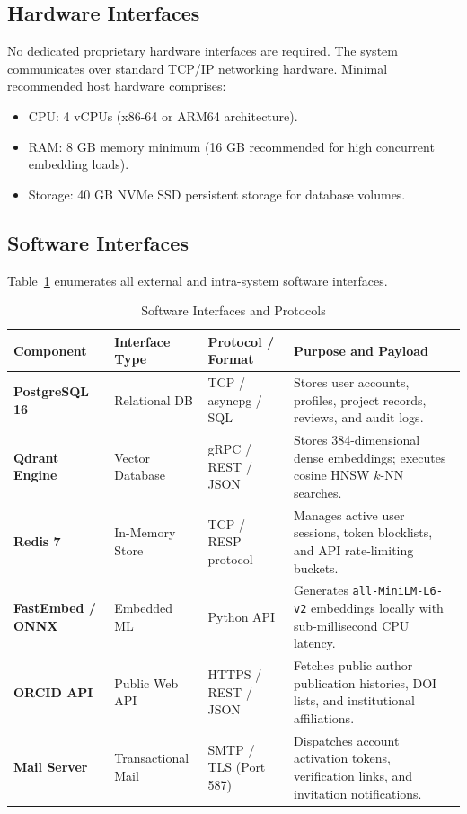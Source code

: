 \documentclass[11pt,a4paper]{article}
\begin{document}
\subsection{Hardware Interfaces}
No dedicated proprietary hardware interfaces are required. The system communicates over standard TCP/IP networking hardware. Minimal recommended host hardware comprises:
\begin{itemize}[noitemsep]
    \item CPU: 4 vCPUs (x86-64 or ARM64 architecture).
    \item RAM: 8 GB memory minimum (16 GB recommended for high concurrent embedding loads).
    \item Storage: 40 GB NVMe SSD persistent storage for database volumes.
\end{itemize}

\subsection{Software Interfaces}
Table~\ref{tab:software_interfaces} enumerates all external and intra-system software interfaces.

\begin{table}[H]
\centering
\small
\caption{Software Interfaces and Protocols}
\label{tab:software_interfaces}
\begin{tabularx}{\textwidth}{@{}l l p{3.2cm} X@{}}
\toprule
\textbf{Component} & \textbf{Interface Type} & \textbf{Protocol / Format} & \textbf{Purpose and Payload} \\
\midrule
\textbf{PostgreSQL 16} & Relational DB & TCP / asyncpg / SQL & Stores user accounts, profiles, project records, reviews, and audit logs. \\
\addlinespace
\textbf{Qdrant Engine} & Vector Database & gRPC / REST / JSON & Stores 384-dimensional dense embeddings; executes cosine HNSW $k$-NN searches. \\
\addlinespace
\textbf{Redis 7} & In-Memory Store & TCP / RESP protocol & Manages active user sessions, token blocklists, and API rate-limiting buckets. \\
\addlinespace
\textbf{FastEmbed / ONNX} & Embedded ML & Python API & Generates \texttt{all-MiniLM-L6-v2} embeddings locally with sub-millisecond CPU latency. \\
\addlinespace
\textbf{ORCID API} & Public Web API & HTTPS / REST / JSON & Fetches public author publication histories, DOI lists, and institutional affiliations. \\
\addlinespace
\textbf{Mail Server} & Transactional Mail & SMTP / TLS (Port 587) & Dispatches account activation tokens, verification links, and invitation notifications. \\
\bottomrule
\end{tabularx}
\end{table}
\end{document}

